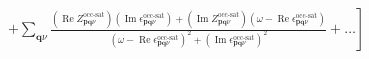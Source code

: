 \begin{align}
& \left. + \sum_{\bm{q}\nu} \frac{\left(\operatorname{Re} Z_{\bm{p}\bm{q}\nu}^{\text{occ-sat}}\right)\left(\operatorname{Im} \epsilon_{\bm{p}\bm{q}\nu}^{\text{occ-sat}}\right) + \left(\operatorname{Im} Z_{\bm{p}\bm{q}\nu}^{\text{occ-sat}}\right)\left(\omega - \operatorname{Re} \epsilon_{\bm{p}\bm{q}\nu}^{\text{occ-sat}}\right)}{\left(\omega - \operatorname{Re} \epsilon_{\bm{p}\bm{q}\nu}^{\text{occ-sat}}\right)^2 + \left(\operatorname{Im} \epsilon_{\bm{p}\bm{q}\nu}^{\text{occ-sat}}\right)^2} + \ldots \right]
\end{align}
